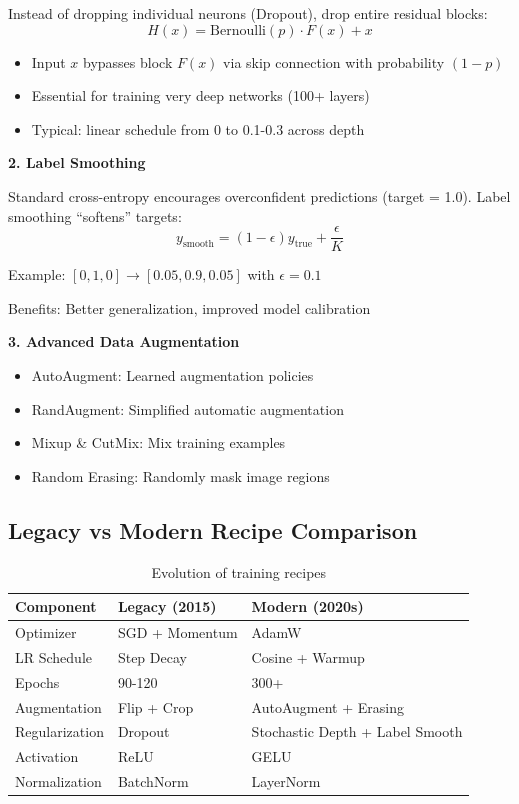 \documentclass{article}
\begin{document}
Instead of dropping individual neurons (Dropout), drop entire residual blocks:
\begin{equation}
H(x) = \text{Bernoulli}(p) \cdot F(x) + x
\end{equation}

\begin{itemize}
    \item Input $x$ bypasses block $F(x)$ via skip connection with probability $(1-p)$
    \item Essential for training very deep networks (100+ layers)
    \item Typical: linear schedule from 0 to 0.1-0.3 across depth
\end{itemize}

\textbf{2. Label Smoothing}

Standard cross-entropy encourages overconfident predictions (target = 1.0). Label smoothing ``softens'' targets:
\begin{equation}
y_{\text{smooth}} = (1-\epsilon)y_{\text{true}} + \frac{\epsilon}{K}
\end{equation}

Example: $[0,1,0] \rightarrow [0.05, 0.9, 0.05]$ with $\epsilon=0.1$

Benefits: Better generalization, improved model calibration

\textbf{3. Advanced Data Augmentation}
\begin{itemize}
    \item AutoAugment: Learned augmentation policies
    \item RandAugment: Simplified automatic augmentation
    \item Mixup \& CutMix: Mix training examples
    \item Random Erasing: Randomly mask image regions
\end{itemize}

\subsection{Legacy vs Modern Recipe Comparison}

\begin{table}[h]
\centering
\begin{tabular}{|l|l|l|}
\hline
\textbf{Component} & \textbf{Legacy (2015)} & \textbf{Modern (2020s)} \\
\hline
Optimizer & SGD + Momentum & AdamW \\
LR Schedule & Step Decay & Cosine + Warmup \\
Epochs & 90-120 & 300+ \\
Augmentation & Flip + Crop & AutoAugment + Erasing \\
Regularization & Dropout & Stochastic Depth + Label Smooth \\
Activation & ReLU & GELU \\
Normalization & BatchNorm & LayerNorm \\
\hline
\end{tabular}
\caption{Evolution of training recipes}
\end{table}
\end{document}
